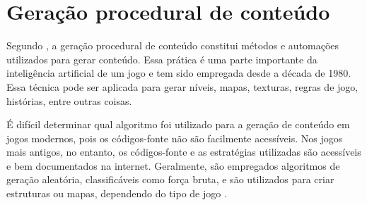 \section{Geração procedural de conteúdo}

Segundo , a geração procedural de conteúdo constitui métodos e automações utilizados para gerar conteúdo. Essa prática é uma parte importante da inteligência artificial de um jogo e tem sido empregada desde a década de 1980. Essa técnica pode ser aplicada para gerar níveis, mapas, texturas, regras de jogo, histórias, entre outras coisas.

É difícil determinar qual algoritmo foi utilizado para a geração de conteúdo em jogos modernos, pois os códigos-fonte não são facilmente acessíveis. Nos jogos mais antigos, no entanto, os códigos-fonte e as estratégias utilizadas são acessíveis e bem documentados na internet. Geralmente, são empregados algoritmos de geração aleatória, classificáveis como força bruta, e são utilizados para criar estruturas ou mapas, dependendo do tipo de jogo \cite{dormans2010adventures}.